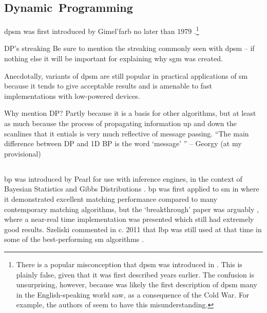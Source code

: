\subsection{Dynamic~Programming}

\gls{dpsm} was first introduced by Gimel'farb no later than 1979 \cite{Gimelfarb1979}.\footnote{There is a popular misconception that \gls{dpsm} was introduced in \cite{Ohta1985}.  This is plainly false, given that it was first described years earlier.  The confusion is unsurprising, however, because \cite{Ohta1985} was likely the first description of \gls{dpsm} many in the English-speaking world saw, as a consequence of the Cold War.  For example, the authors \cite{Salmen2009} of seem to have this misunderstanding.}  

\begin{anfxnote}{DP's streaking}
    Be sure to mention the streaking commonly seen with \gls{dpsm} -- if nothing else it will be important for explaining why \gls{sgm} was created.
\end{anfxnote}

Anecdotally, variants of \gls{dpsm} are still popular in practical applications of \gls{sm} because it tends to give acceptable results and is amenable to fast implementations with low-powered devices.

\begin{anfxnote}{Why mention DP?}
    Partly because it is a basis for other algorithms, but at least as much because the process of propagating information up and down the scanlines that it entials is very much reflective of message passing.  ``The main difference between DP and 1D BP is the word `message' '' -- Georgy (at my provisional)
\end{anfxnote}

\subsection{}
\gls{bp} was introduced by Pearl \cite{Pearl1982} for use with inference engines, in the context of Bayesian Statistics \fxnote[inline]{[ref]} and Gibbs Distributions \fxnote[inline]{[ref]}.  \gls{bp} was first applied to \gls{sm} in \cite{Sun2003} where it demonstrated excellent matching performance compared to many contemporary matching algorithms, but the `breakthrough' paper was arguably \cite{Felzenszwalb2006}, where a near-real time implementation was presented which still had extremely good results.  Szeliski commented in c. 2011 that \gls{lbp} was still used at that time in some of the best-performing \gls{sm} algorithms \cite[p. 163]{Szeliski2011}.

